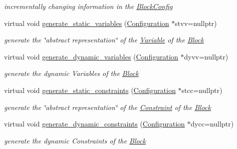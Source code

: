 \begin{Indent}
\begin{DoxyCompactItemize}
\begin{DoxyCompactList}\small\item\em incrementally changing information in the \mbox{\hyperlink{class_s_m_spp__di__unipi__it_1_1_block_config}{Block\+Config}} \end{DoxyCompactList}\item 
virtual void \mbox{\hyperlink{class_s_m_spp__di__unipi__it_1_1_block_acd79fd0980af547f2f06241cb989094e}{generate\+\_\+static\+\_\+variables}} (\mbox{\hyperlink{class_s_m_spp__di__unipi__it_1_1_configuration}{Configuration}} $\ast$stvv=nullptr)
\begin{DoxyCompactList}\small\item\em generate the \char`\"{}abstract representation\char`\"{} of the \mbox{\hyperlink{class_s_m_spp__di__unipi__it_1_1_variable}{Variable}} of the \mbox{\hyperlink{class_s_m_spp__di__unipi__it_1_1_block}{Block}} \end{DoxyCompactList}\item 
virtual void \mbox{\hyperlink{class_s_m_spp__di__unipi__it_1_1_block_ab90d0f60518eee75370e29c95bae4522}{generate\+\_\+dynamic\+\_\+variables}} (\mbox{\hyperlink{class_s_m_spp__di__unipi__it_1_1_configuration}{Configuration}} $\ast$dyvv=nullptr)
\begin{DoxyCompactList}\small\item\em generate the dynamic Variables of the \mbox{\hyperlink{class_s_m_spp__di__unipi__it_1_1_block}{Block}} \end{DoxyCompactList}\item 
virtual void \mbox{\hyperlink{class_s_m_spp__di__unipi__it_1_1_block_add9b4c918157bda66b5183f67953d49b}{generate\+\_\+static\+\_\+constraints}} (\mbox{\hyperlink{class_s_m_spp__di__unipi__it_1_1_configuration}{Configuration}} $\ast$stcc=nullptr)
\begin{DoxyCompactList}\small\item\em generate the \char`\"{}abstract representation\char`\"{} of the \mbox{\hyperlink{class_s_m_spp__di__unipi__it_1_1_constraint}{Constraint}} of the \mbox{\hyperlink{class_s_m_spp__di__unipi__it_1_1_block}{Block}} \end{DoxyCompactList}\item 
virtual void \mbox{\hyperlink{class_s_m_spp__di__unipi__it_1_1_block_a306892932ce912f30548f3f3e4072e9b}{generate\+\_\+dynamic\+\_\+constraints}} (\mbox{\hyperlink{class_s_m_spp__di__unipi__it_1_1_configuration}{Configuration}} $\ast$dycc=nullptr)
\begin{DoxyCompactList}\small\item\em generate the dynamic Constraints of the \mbox{\hyperlink{class_s_m_spp__di__unipi__it_1_1_block}{Block}} \end{DoxyCompactList}\item 

\end{DoxyCompactItemize}
\end{Indent}
